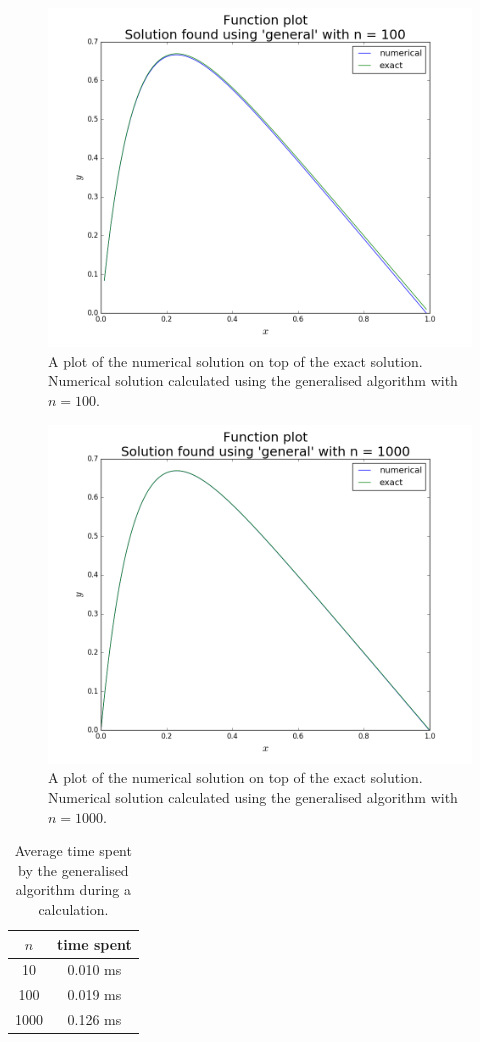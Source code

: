 \documentclass[reprint,english]{revtex4-1}
\begin{document}
\begin{figure}[h]
\includegraphics[scale=0.28]{figures/general_100_funcplot.png}
\caption{A plot of the numerical solution on top of the exact solution. Numerical solution calculated using the generalised algorithm with \(n=100\).}\label{fig:gen_alg_n100}
\end{figure}
\begin{figure}[h]
\includegraphics[scale=0.28]{figures/general_1000_funcplot.png}
\caption{A plot of the numerical solution on top of the exact solution. Numerical solution calculated using the generalised algorithm with \(n=1000\).}\label{fig:gen_alg_n1000}
\end{figure}
\begin{table}[h]
\caption{Average time spent by the generalised algorithm during a calculation.}\label{tab:time_gen_alg_n10}
\begin{tabular}{|c|c|}
\hline
\(n\) & time spent \\\hline
  10  & 0.010 ms \\\hline
 100  & 0.019 ms \\\hline
1000  & 0.126 ms \\\hline
\end{tabular}
\end{table}
\end{document}
